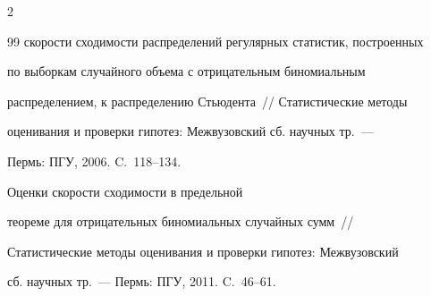 \begin{multicols}{2}
{{\begin{thebibliography}{99}
скорости сходимости распределений регулярных статистик, построенных


по выборкам случайного объема с отрицательным биномиальным


распределением, к распределению Стьюдента~// Статистические методы


оценивания и проверки гипотез: Межвузовский сб. научных тр.~--- 


Пермь: ПГУ, 2006. C.~118--134.





\label{end\stat}







 Оценки скорости сходимости в предельной


теореме для отрицательных биномиальных случайных сумм~//


Статистические методы оценивания и проверки гипотез: Межвузовский


сб. научных тр.~--- Пермь: ПГУ, 2011. C.~46--61.


\end{thebibliography}


}


}








\end{multicols}


